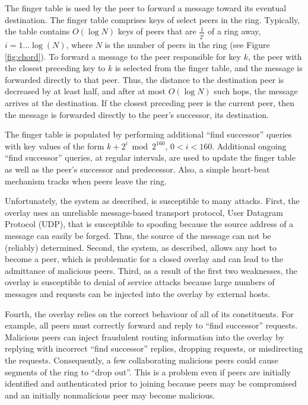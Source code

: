 \documentclass[11pt]{article}
\begin{document}
The finger table is used by the peer to forward a message toward
its eventual destination.  The finger table comprises keys of select
peers in the ring.  Typically, the table contains $O(\log N)$ keys
of peers that are $\frac{1}{2^i}$ of a ring away, $i = 1 \ldots
\log(N)$, where $N$ is the number of peers in the ring (see Figure
\ref{fig:chord}).   To forward a message to the peer responsible
for key $k$, the peer with the closest preceding key to $k$ is
selected from the finger table, and the message is forwarded directly
to that peer.  Thus, the distance to the destination peer is decreased
by at least half, and after at most $O(\log N)$ such hops, the message
arrives at the destination.  If the closest preceding peer is the
current peer, then the message is forwarded directly to the peer's
successor, its destination.

The finger table is populated by performing additional ``find
successor'' queries with key values of the form $k + 2^i \bmod
2^{160}$, $0 < i < 160$.  Additional ongoing ``find successor''
queries, at regular intervals, are used to update the finger table
as well as the peer's successor and predecessor.  Also, a simple
heart-beat mechanism tracks when peers leave the ring.

Unfortunately, the system as described, is susceptible to many
attacks.  First, the overlay uses an unreliable message-based
transport protocol, User Datagram Protocol (UDP), that is susceptible
to spoofing because the source address of a message can easily be
forged.  Thus, the source of the message can not be (reliably)
determined.  Second, the system, as described, allows any host to
become a peer, which is problematic for a closed overlay and can
lead to the admittance of malicious peers.  Third, as a result of
the first two weaknesses, the overlay is susceptible to denial of
service attacks because large numbers of messages and requests can
be injected into the overlay by external hosts.

Fourth, the overlay relies on the correct behaviour of all of its
constituents.  For example, all peers must correctly forward and
reply to ``find successor'' requests.  Malicious peers can inject
fraudulent routing information into the overlay by replying with
incorrect ``find successor'' replies, dropping requests, or
misdirecting the requests.  Consequently, a few collaborating
malicious peers could cause segments of the ring to ``drop out''.
This is a problem even if peers are initially identified and
authenticated prior to joining because peers may be compromised and
an initially nonmalicious peer may become malicious.
\end{document}
